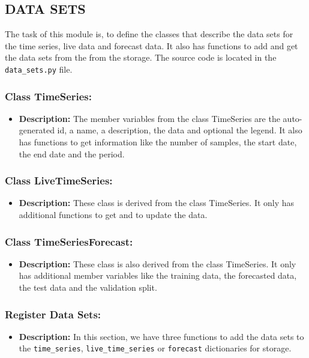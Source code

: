 \documentclass[11pt, a4paper]{article}
\begin{document}
\subsection{DATA SETS}
The task of this module is, to define the classes that describe the data sets for the time series, live data and forecast data.
It also has functions to add and get the data sets from the from the storage.
The source code is located in the \texttt{data\_sets.py} file.


\subsubsection*{Class TimeSeries:}
\begin{itemize}
 \item[] \textbf{Description:} The member variables from the class TimeSeries are the auto-generated id, a name, a description, the data and optional the legend. 
 It also has functions to get information like the number of samples, the start date, the end date and the period.
\end{itemize}


\subsubsection*{Class LiveTimeSeries:}
\begin{itemize}
 \item[] \textbf{Description:} These class is derived from the class TimeSeries. It only has additional functions to get and to update the data.
\end{itemize}


\subsubsection*{Class TimeSeriesForecast:}
\begin{itemize}
 \item[] \textbf{Description:} These class is also derived from the class TimeSeries. It only has additional member variables like 
 the training data, the forecasted data, the test data and the validation split.
\end{itemize}


\subsubsection*{Register Data Sets:}
\begin{itemize}
 \item[] \textbf{Description:} In this section, we have three functions to add the data sets to the \texttt{time\_series}, \texttt{live\_time\_series} or \texttt{forecast} dictionaries for storage.
\end{itemize}
\end{document}
